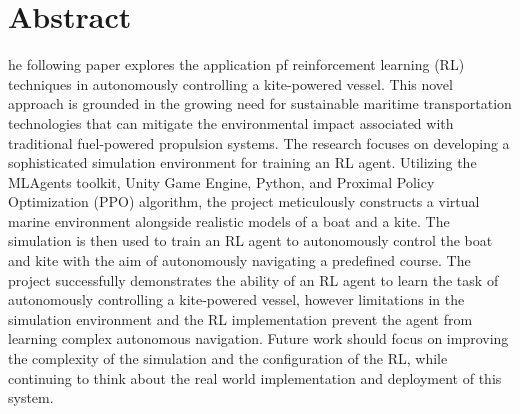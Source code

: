 
\chapter*{Abstract}
\begin{SingleSpace}
he following paper explores the application pf reinforcement learning (RL) techniques in autonomously controlling a kite-powered vessel. This novel approach is grounded in the growing need for sustainable maritime transportation technologies that can mitigate the environmental impact associated with traditional fuel-powered propulsion systems. The research focuses on developing a sophisticated simulation environment for training an RL agent. Utilizing the MLAgents toolkit, Unity Game Engine, Python, and Proximal Policy Optimization (PPO) algorithm, the project meticulously constructs a virtual marine environment alongside realistic models of a boat and a kite. The simulation is then used to train an RL agent to autonomously control the boat and kite with the aim of autonomously navigating a predefined course. The project successfully demonstrates the ability of an RL agent to learn the task of autonomously controlling a kite-powered vessel, however limitations in the simulation environment and the RL implementation prevent the agent from learning complex autonomous navigation. Future work should focus on improving the complexity of the simulation and the configuration of the RL, while continuing to think about the real world implementation and deployment of this system.
\end{SingleSpace}
\clearpage